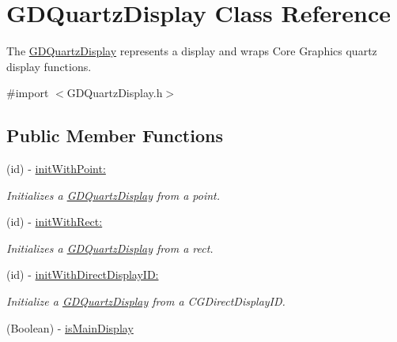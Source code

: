 \hypertarget{interface_g_d_quartz_display}{
\section{GDQuartzDisplay Class Reference}
\label{interface_g_d_quartz_display}
}


The \hyperlink{interface_g_d_quartz_display}{GDQuartzDisplay} represents a display and wraps Core Graphics quartz display functions.  


{\ttfamily \#import $<$GDQuartzDisplay.h$>$}\subsection*{Public Member Functions}
\begin{DoxyCompactItemize}
\item 
(id) -\/ \hyperlink{interface_g_d_quartz_display_ac7ce19beffef302365fa541937a9eb9a}{initWithPoint:}
\begin{DoxyCompactList}\small\item\em Initializes a \hyperlink{interface_g_d_quartz_display}{GDQuartzDisplay} from a point. \item\end{DoxyCompactList}\item 
(id) -\/ \hyperlink{interface_g_d_quartz_display_a9bd1f8110df39a9e04cdb50baba92627}{initWithRect:}
\begin{DoxyCompactList}\small\item\em Initializes a \hyperlink{interface_g_d_quartz_display}{GDQuartzDisplay} from a rect. \item\end{DoxyCompactList}\item 
(id) -\/ \hyperlink{interface_g_d_quartz_display_add090bbaebeff9ba7f5298cd2e50a991}{initWithDirectDisplayID:}
\begin{DoxyCompactList}\small\item\em Initialize a \hyperlink{interface_g_d_quartz_display}{GDQuartzDisplay} from a CGDirectDisplayID. \item\end{DoxyCompactList}\item 
\hypertarget{interface_g_d_quartz_display_a188bab8691a7761bd307b0a8eea740e9}{
(Boolean) -\/ \hyperlink{interface_g_d_quartz_display_a188bab8691a7761bd307b0a8eea740e9}{isMainDisplay}}
\label{interface_g_d_quartz_display_a188bab8691a7761bd307b0a8eea740e9}


\end{DoxyCompactItemize}
